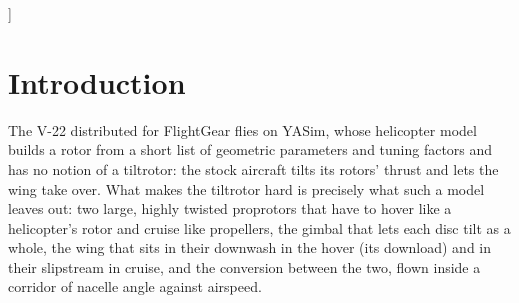 \documentclass[10pt,a4paper,twocolumn]{article}
\begin{document}
\begin{@twocolumnfalse}
\begin{abstract}
unpublished, with the drag Ferguson added from them it needs \NXaMin{} to \NXaMax\,\% of the measured power at 10\,000\,ft in airplane mode
with the gear up, while through the conversion it needs more than the test at both altitudes.
As a V-22, with 11.5\,ft$^2$ of parasite drag fitted to Boeing's airframe polar and the drive's torque limit fitted to the
sea-level hover ceiling, its maximum level speed at 42\,000\,lb is \NVsl{} and \NVhi\,KTAS at sea level and 17\,000\,ft against
274 and 321, its hover ceiling at 8400 and 16\,000\,ft \NCmidPct{} and \NChiPct\,\% from Boeing's chart, and its pitch attitude
through the conversion within \NCvPitchRms$^\circ$ (rms) of the flight test's. Deficiencies are quantified: the XV-15's power in
helicopter mode, \NXhelLo\,\% at 45\,kt and \NXhelHi\,\% at 94\,kt; its collective gradient in hover, \NHgradPct\,\% steeper than
measured; the V-22 wing's download, \NDlV\,\% of thrust against \NDlVtest; and the wing's share of the lift at 30$^\circ$ of nacelle.
In descent each rotor's inflow follows Johnson's vortex ring state model: in vertical descent at a fixed lever the V-22 runs away between
\NVrsLo{} and \NVrsHi\,ft/min, and in his encounter it drops and then rolls off, each rotor on its own velocities.
\end{abstract}
\vspace{6pt}
\end{@twocolumnfalse}
]

\section{Introduction}
The V-22 distributed for FlightGear flies on YASim, whose helicopter model builds a rotor from a short list of geometric
parameters and tuning factors and has no notion of a tiltrotor: the stock aircraft tilts its rotors' thrust and lets the wing
take over. What makes the tiltrotor hard is precisely what such a model leaves out: two large, highly twisted proprotors that
have to hover like a helicopter's rotor and cruise like propellers, the gimbal that lets each disc tilt as a whole, the wing that
sits in their downwash in the hover (its download) and in their slipstream in cruise, and the conversion between the two, flown
inside a corridor of nacelle angle against airspeed.
\end{document}
